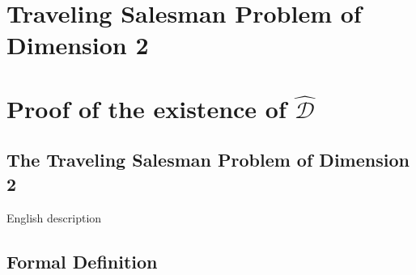 \documentclass[11pt]{article}
\begin{document}
\newpage
\section*{Traveling Salesman Problem of Dimension 2}
\section{Proof of the existence of $\hat{\mathcal{D}}$}

\subsection{The Traveling Salesman Problem of Dimension 2}
English description

\subsection{Formal Definition}
\end{document}
